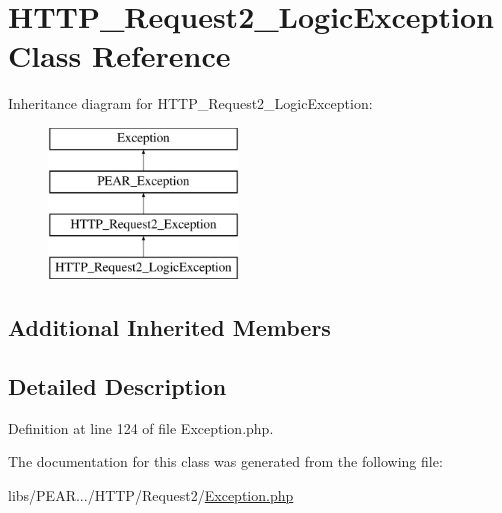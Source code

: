 \hypertarget{classHTTP__Request2__LogicException}{\section{H\-T\-T\-P\-\_\-\-Request2\-\_\-\-Logic\-Exception Class Reference}
\label{classHTTP__Request2__LogicException}
}
Inheritance diagram for H\-T\-T\-P\-\_\-\-Request2\-\_\-\-Logic\-Exception\-:\begin{figure}[H]
\begin{center}
\leavevmode
\includegraphics[height=4.000000cm]{classHTTP__Request2__LogicException}
\end{center}
\end{figure}
\subsection*{Additional Inherited Members}


\subsection{Detailed Description}


Definition at line 124 of file Exception.\-php.



The documentation for this class was generated from the following file\-:\begin{DoxyCompactItemize}
\item 
libs/\-P\-E\-A\-R.../\-H\-T\-T\-P/\-Request2/\hyperlink{HTTP_2Request2_2Exception_8php}{Exception.\-php}\end{DoxyCompactItemize}
